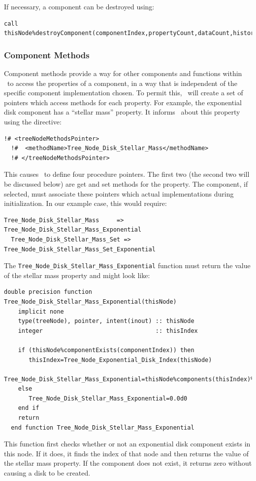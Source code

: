If necessary, a component can be destroyed using:
\begin{lstlisting}[escapechar=@,breaklines,prebreak=\&,postbreak=\&]
       call thisNode%destroyComponent(componentIndex,propertyCount,dataCount,historyCount)
\end{lstlisting}

\subsubsection{Component Methods}

Component methods provide a way for other components and functions within \glc\ to access the properties of a component, in a way that is independent of the specific component implementation chosen. To permit this, \glc\ will create a set of pointers which access methods for each property. For example, the exponential disk component has a ``stellar mass'' property. It informs \glc\ about this property using the directive:
\begin{lstlisting}[escapechar=@,breaklines,prebreak=\&,postbreak=\&]
  !# <treeNodeMethodsPointer>
  !#  <methodName>Tree_Node_Disk_Stellar_Mass</methodName>
  !# </treeNodeMethodsPointer>
\end{lstlisting}
This causes \glc\ to define four procedure pointers. The first two (the second two will be discussed below) are get and set methods for the property. The component, if selected, must associate these pointers which actual implementations during initialization. In our example case, this would require:
\begin{lstlisting}[escapechar=@,breaklines,prebreak=\&,postbreak=\&]
  Tree_Node_Disk_Stellar_Mass     => Tree_Node_Disk_Stellar_Mass_Exponential
  Tree_Node_Disk_Stellar_Mass_Set => Tree_Node_Disk_Stellar_Mass_Set_Exponential
\end{lstlisting}
The {\tt Tree\_Node\_Disk\_Stellar\_Mass\_Exponential} function must return the value of the stellar mass property and might look like:
\begin{lstlisting}[escapechar=@,breaklines,prebreak=\&,postbreak=\&]
  double precision function Tree_Node_Disk_Stellar_Mass_Exponential(thisNode)
    implicit none
    type(treeNode), pointer, intent(inout) :: thisNode
    integer                                :: thisIndex

    if (thisNode%componentExists(componentIndex)) then
       thisIndex=Tree_Node_Exponential_Disk_Index(thisNode)
       Tree_Node_Disk_Stellar_Mass_Exponential=thisNode%components(thisIndex)%properties(stellarMassIndex,propertyValue)
    else
       Tree_Node_Disk_Stellar_Mass_Exponential=0.0d0
    end if
    return
  end function Tree_Node_Disk_Stellar_Mass_Exponential
\end{lstlisting}
This function first checks whether or not an exponential disk component exists in this node. If it does, it finds the index of that node and then returns the value of the stellar mass property. If the component does not exist, it returns zero without causing a disk to be created.

